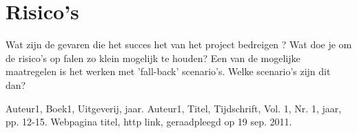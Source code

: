 \documentclass[11pt,twoside,a4paper]{article}
\begin{document}
\section{Risico's}
Wat zijn de gevaren die het succes het van het project bedreigen ? Wat doe je om de risico's op falen zo klein mogelijk te houden? Een van de mogelijke maatregelen is het werken met 'fall-back' scenario’s. Welke scenario's zijn dit dan?


\begin{thebibliography}{9}
Auteur1, 
Boek1, 
Uitgeverij, 
jaar.
Auteur1, 
Titel, 
Tijdschrift, 
Vol. 1, 
Nr. 1, 
jaar, 
pp. 12-15.
Webpagina titel, 
http link, 
geraadpleegd op 19 sep. 2011.
\end{thebibliography}
\end{document}
